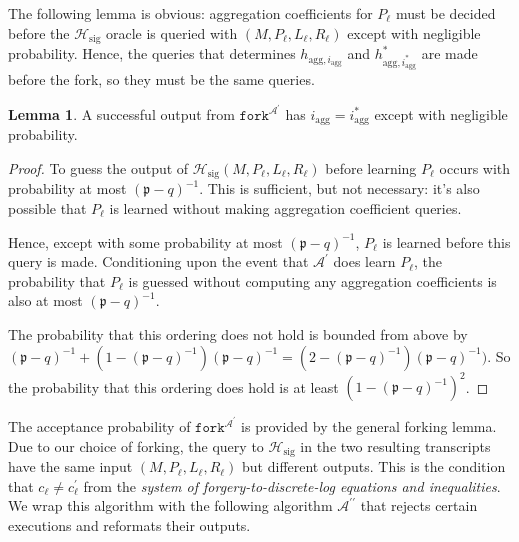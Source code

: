 \documentclass{mrl}
\theoremstyle{definition}
\numberwithin{theorem}{subsection}
\newtheorem{lemma}[theorem]{Lemma}
\newcommand{\adversary}{\mathcal{A}}
\newcommand{\p}{\mathfrak{p}}
\begin{document}
The following lemma is obvious: aggregation coefficients for $P_\ell$ must be decided before the $\mathcal{H}_{\text{sig}}$ oracle is queried with $(M, P_\ell, L_\ell, R_\ell)$ except with negligible probability. Hence, the queries that determines $h_{\text{agg},i_{\text{agg}}}$ and $h_{\text{agg},i_{\text{agg}}^*}^*$ are made before the fork, so they must be the same queries.
\begin{lemma}
A successful output from $\texttt{fork}^{\adversary^\prime}$ has $i_{\text{agg}} = i^*_{\text{agg}}$ except with negligible probability.
\end{lemma}
\begin{proof}
To guess the output of $\mathcal{H}_{\text{sig}}(M, P_\ell, L_\ell, R_\ell)$ before learning $P_\ell$ occurs with probability at most $(\p - q)^{-1}$. This is sufficient, but not necessary: it's also possible that $P_\ell$ is learned without making aggregation coefficient queries.

Hence, except with some probability at most $(\p - q)^{-1}$, $P_\ell$ is learned before this query is made. Conditioning upon the event that $\adversary^\prime$ does learn $P_\ell$, the probability that $P_\ell$ is guessed without computing any aggregation coefficients is also at most $(\p -q )^{-1}$.

The probability that this ordering does not hold is bounded from above by $(\p - q)^{-1} + (1 - (\p - q)^{-1})(\p - q)^{-1} = (2 - (\p - q)^{-1})(\p - q)^{-1})$. So the probability that this ordering does hold is at least $(1-(\p-q)^{-1})^2$.
\end{proof}


The acceptance probability of  $\texttt{fork}^{\adversary^\prime}$ is provided by the general forking lemma. Due to our choice of forking, the query to $\mathcal{H}_{\text{sig}}$ in the two resulting transcripts have the same input $(M, P_\ell, L_\ell, R_\ell)$ but different outputs. This is the condition that $c_\ell \neq c_\ell^{\prime}$ from the \textit{system of forgery-to-discrete-log equations and inequalities}. We wrap this algorithm with the following algorithm $\adversary^{\prime \prime}$ that rejects certain executions and reformats their outputs.
\end{document}

